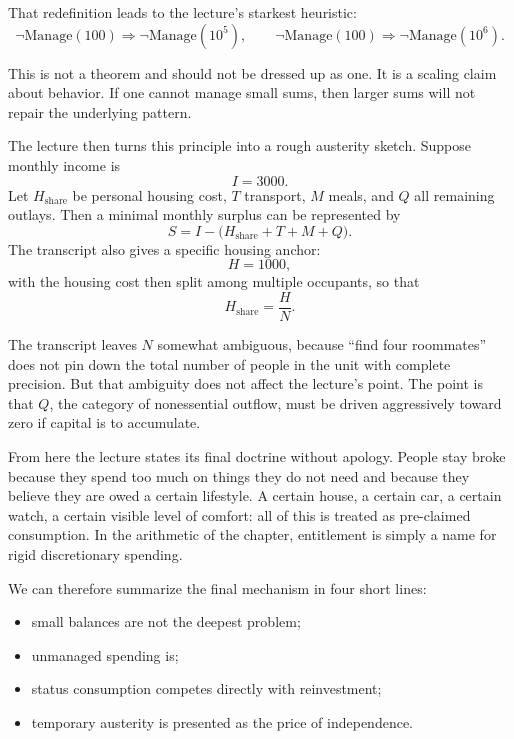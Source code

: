 That redefinition leads to the lecture's starkest heuristic:
\begin{equation}
\neg \mathrm{Manage}(100)\Rightarrow \neg \mathrm{Manage}(10^5),\qquad
\neg \mathrm{Manage}(100)\Rightarrow \neg \mathrm{Manage}(10^6).
\end{equation}

This is not a theorem and should not be dressed up as one. It is a scaling claim about behavior. If one cannot manage small sums, then larger sums will not repair the underlying pattern.

The lecture then turns this principle into a rough austerity sketch. Suppose monthly income is
\begin{equation}
I = 3000.
\end{equation}
Let \(H_{\text{share}}\) be personal housing cost, \(T\) transport, \(M\) meals, and \(Q\) all remaining outlays. Then a minimal monthly surplus can be represented by
\begin{equation}
S = I - \bigl(H_{\text{share}} + T + M + Q\bigr).
\end{equation}
The transcript also gives a specific housing anchor:
\begin{equation}
H = 1000,
\end{equation}
with the housing cost then split among multiple occupants, so that
\begin{equation}
H_{\text{share}} = \frac{H}{N}.
\end{equation}

The transcript leaves \(N\) somewhat ambiguous, because ``find four roommates'' does not pin down the total number of people in the unit with complete precision. But that ambiguity does not affect the lecture's point. The point is that \(Q\), the category of nonessential outflow, must be driven aggressively toward zero if capital is to accumulate.

From here the lecture states its final doctrine without apology. People stay broke because they spend too much on things they do not need and because they believe they are owed a certain lifestyle. A certain house, a certain car, a certain watch, a certain visible level of comfort: all of this is treated as pre-claimed consumption. In the arithmetic of the chapter, entitlement is simply a name for rigid discretionary spending.

We can therefore summarize the final mechanism in four short lines:
\begin{itemize}
\item small balances are not the deepest problem;
\item unmanaged spending is;
\item status consumption competes directly with reinvestment;
\item temporary austerity is presented as the price of independence.
\end{itemize}

